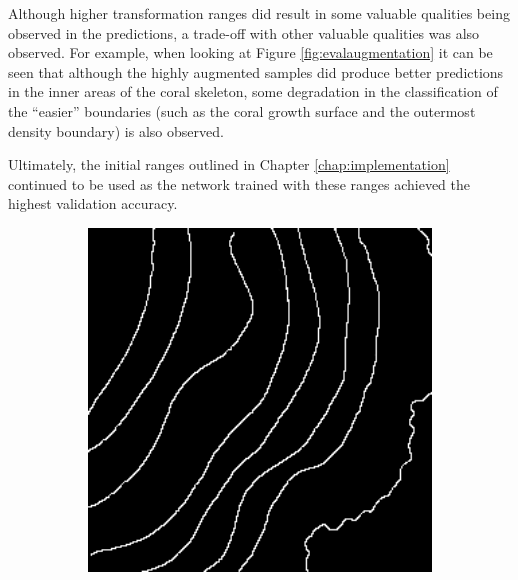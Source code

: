 Although higher transformation ranges did result in some valuable qualities being observed in the predictions, a trade-off with other valuable qualities was also observed. For example, when looking at Figure \ref{fig:evalaugmentation} it can be seen that although the highly augmented samples did produce better predictions in the inner areas of the coral skeleton, some degradation in the classification of the ``easier'' boundaries (such as the coral growth surface and the outermost density boundary) is also observed.

Ultimately, the initial ranges outlined in Chapter \ref{chap:implementation} continued to be used as the network trained with these ranges achieved the highest validation accuracy.

\begin{figure}[!t]
    \centering
    \begin{subfigure}[t]{0.24\textwidth}
        \centering
        \includegraphics[width=1\textwidth, valign=c]{images/lr-comparison.png}
        \caption{}
    \end{subfigure}
    \begin{subfigure}[t]{0.24\textwidth}
        \centering

\end{subfigure}
\end{figure}
